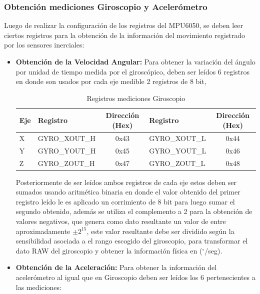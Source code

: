\documentclass[12pt,a4paper]{article}
\newcommand{\grad}{$^{\circ}$}
\begin{document}
\subsubsection{Obtención mediciones Giroscopio y Acelerómetro}
Luego de realizar la configuración de los registros del MPU6050, se deben leer ciertos registros para la obtención de la información del movimiento registrado por los sensores inerciales:

\begin{itemize}
	\item \textbf{Obtención de la Velocidad Angular:} Para obtener la variación del ángulo por unidad de tiempo medida por el giroscópico, deben ser leídos 6 registros en donde son usados por cada eje medible 2 registros de 8 bit,
	
	\begin{table}[H]
		\centering
		\label{table:registrosgyro}
		\begin{tabular}{|l|l|c|l|c|}
			\hline
			\textbf{Eje} & \textbf{Registro} & \textbf{Dirección (Hex)} & \textbf{Registro} & \textbf{Dirección (Hex)} \\ \hline
			X            & GYRO\_XOUT\_H     & 0x43                     & GYRO\_XOUT\_L     & 0x44                     \\ \hline
			Y            & GYRO\_YOUT\_H     & 0x45                     & GYRO\_YOUT\_L     & 0x46                     \\ \hline
			Z            & GYRO\_ZOUT\_H     & 0x47                     & GYRO\_ZOUT\_L     & 0x48                     \\ \hline
		\end{tabular}
		\caption{Registros mediciones Giroscopio}					
	\end{table}
	
	Posteriormente de ser leídos ambos registros de cada eje estos deben ser sumados usando aritmética binaria en donde el valor obtenido del primer registro leído le es aplicado un corrimiento de 8 bit para luego sumar el segundo obtenido, además se utiliza el complemento a 2 para la obtención de valores negativos, que genera como dato resultante un valor de entre aproximadamente $\pm 2^{15}$, este valor resultante debe ser dividido según la sensibilidad asociada a el rango escogido del giroscopio, para transformar el dato RAW del giroscopio y obtener la información física en (\grad/seg).
	
	\item \textbf{Obtención de la Aceleración:} Para obtener la información del acelerómetro al igual que en Giroscopio deben ser leídos los 6 pertenecientes a las mediciones:


\end{itemize}
\end{document}
